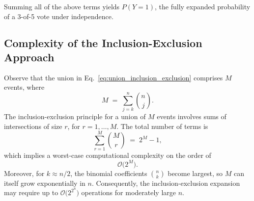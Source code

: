 Summing all of the above terms yields \(P(Y=1)\), the fully expanded probability of a 3-of-5 vote under independence.

\subsection{Complexity of the Inclusion-Exclusion Approach}
Observe that the union in Eq.~\eqref{eq:union_inclusion_exclusion} comprises \(M\) events, where
\[
M \;=\;\sum_{j=k}^{n} \binom{n}{j}.
\]
The inclusion-exclusion principle for a union of \(M\) events involves sums of intersections of size \(r\), for \(r=1,\dots,M\). The total number of terms is
\[
\sum_{r=1}^{M} \binom{M}{r}
\;=\;
2^{M}-1,
\]
which implies a worst-case computational complexity on the order of
\[
\mathcal{O}\bigl(2^{M}\bigr).
\]
Moreover, for \(k\approx n/2\), the binomial coefficients \(\binom{n}{k}\) become largest, so \(M\) can itself grow exponentially in \(n\). Consequently, the inclusion-exclusion expansion may require up to \(\mathcal{O}\bigl(2^{2^{n}}\bigr)\) operations for moderately large \(n\).
